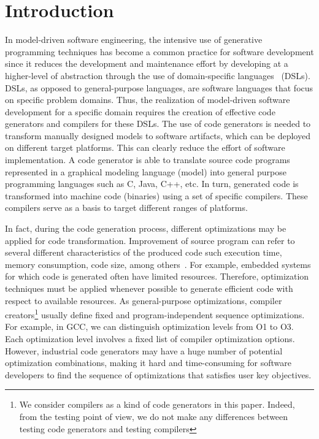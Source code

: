 \section{Introduction}
In model-driven software engineering, the intensive use of generative programming techniques has become a common practice for software development since it reduces the development and maintenance effort by developing at a higher-level of abstraction through the use of domain-specific languages~\cite{brambilla2012model} (DSLs). 
DSLs, as opposed to general-purpose languages, are software languages that focus on specific problem domains. Thus, the realization of model-driven software development for a specific domain requires the creation of effective code generators and compilers for these DSLs.
The use of code generators is needed to transform manually designed models to software artifacts, which can be deployed on different target platforms. This can clearly reduce the effort of software implementation. A code generator is able to translate source code programs represented in a graphical modeling language (model) into general purpose programming languages such as C, Java, C++, etc. In turn, generated code is transformed into machine code (binaries) using a set of specific compilers.
These compilers serve as a basis to target different ranges of platforms. 

In fact, during the code generation process, different optimizations may be applied for code transformation. Improvement of source program can refer to several different characteristics of the produced code such execution time, memory consumption, code size, among others~\cite{almagor2004finding,pan2006fast}.
For example, embedded systems for which code is generated often have limited resources. 
Therefore, optimization techniques must be applied whenever possible to generate efficient code with respect to available resources\cite{nagiub2013automatic}. 
As general-purpose optimizations, compiler creators\footnote{We consider compilers as a kind of code generators in this paper. Indeed, from the testing point of view, we do not make any differences between testing code generators and testing compilers} usually define fixed and program-independent sequence optimizations.
For example, in GCC, we can distinguish optimization levels from O1 to O3. Each optimization level involves a fixed list of compiler optimization options. 
However, industrial code generators may have a huge number of potential optimization combinations, making it hard and time-consuming for software developers to find the sequence of optimizations that satisfies user key objectives. 


